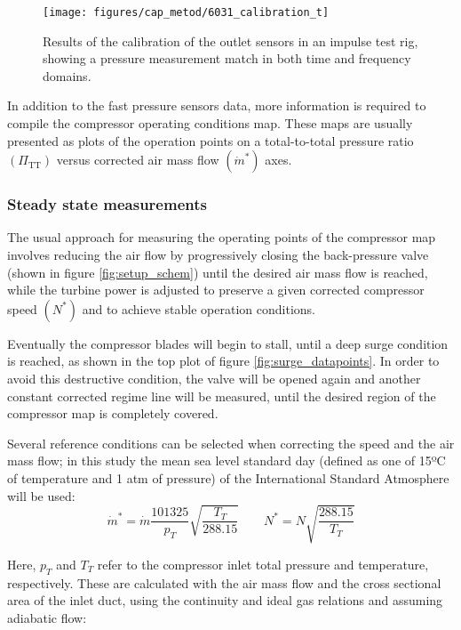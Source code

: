 \begin{figure}[t!]
\centering
\texttt{[image: figures/cap\_metod/6031\_calibration\_t]}
\caption[Results of the calibration of the outlet sensors]{Results of the calibration of the outlet sensors in an impulse test rig, showing a pressure measurement match in both time and frequency domains.}
\label{fig:6031_calibration}
\end{figure}

In addition to the fast pressure sensors data, more information is required to compile the compressor operating conditions map. These maps are usually presented as plots of the operation points on a total-to-total pressure ratio $(\Pi_\text{TT})$ versus corrected air mass flow $(\dot m^*)$ axes.

\subsubsection{Steady state measurements}
\label{sub:steady_state_measurements}

The usual approach for measuring the operating points of the compressor map involves reducing the air flow by progressively closing the back-pressure valve (shown in figure \ref{fig:setup_schem}) until the desired air mass flow is reached, while the turbine power is adjusted to preserve a given corrected compressor speed $(N^*)$ and to achieve stable operation conditions.

Eventually the compressor blades will begin to stall, until a deep surge condition is reached, as shown in the top plot of figure \ref{fig:surge_datapoints}. In order to avoid this destructive condition, the valve will be opened again and another constant corrected regime line will be measured, until the desired region of the compressor map is completely covered.

Several reference conditions can be selected when correcting the speed and the air mass flow; in this study the mean sea level standard day (defined as one of 15ºC of temperature and 1 atm of pressure) of the International Standard Atmosphere will be used:
\begin{equation}
    \dot m^* = \dot m\frac{101325}{p_{T}}\sqrt{\frac{T_{T}}{288.15}}
    \qquad N^*=N\sqrt{\frac{288.15}{T_{T}}}
\end{equation}

Here, $p_{T}$ and $T_{T}$ refer to the compressor inlet total pressure and temperature, respectively. These are calculated with the air mass flow and the cross sectional area of the inlet duct, using the continuity and ideal gas relations and assuming adiabatic flow:

